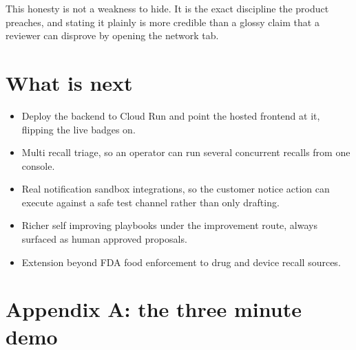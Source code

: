 \documentclass[11pt]{article}
\begin{document}
This honesty is not a weakness to hide. It is the exact discipline the product preaches, and stating
it plainly is more credible than a glossy claim that a reviewer can disprove by opening the network
tab.

\section{What is next}

\begin{itemize}
\item Deploy the backend to Cloud Run and point the hosted frontend at it, flipping the live badges on.
\item Multi recall triage, so an operator can run several concurrent recalls from one console.
\item Real notification sandbox integrations, so the customer notice action can execute against a safe test channel rather than only drafting.
\item Richer self improving playbooks under the improvement route, always surfaced as human approved proposals.
\item Extension beyond FDA food enforcement to drug and device recall sources.
\end{itemize}

\section{Appendix A: the three minute demo}
\end{document}
